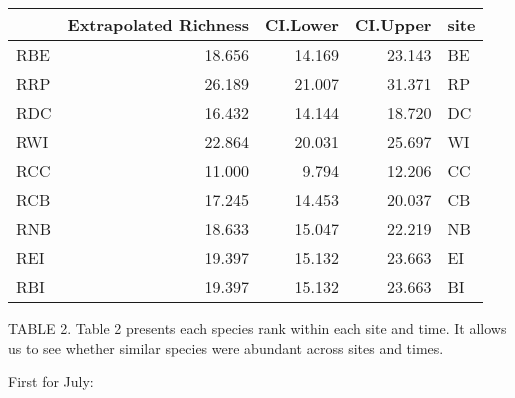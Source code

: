 \documentclass[]{article}
\begin{document}
\begin{longtable}[]{@{}lrrrl@{}}
\toprule
& Extrapolated Richness & CI.Lower & CI.Upper & site\tabularnewline
\midrule
\endhead
RBE & 18.656 & 14.169 & 23.143 & BE\tabularnewline
RRP & 26.189 & 21.007 & 31.371 & RP\tabularnewline
RDC & 16.432 & 14.144 & 18.720 & DC\tabularnewline
RWI & 22.864 & 20.031 & 25.697 & WI\tabularnewline
RCC & 11.000 & 9.794 & 12.206 & CC\tabularnewline
RCB & 17.245 & 14.453 & 20.037 & CB\tabularnewline
RNB & 18.633 & 15.047 & 22.219 & NB\tabularnewline
REI & 19.397 & 15.132 & 23.663 & EI\tabularnewline
RBI & 19.397 & 15.132 & 23.663 & BI\tabularnewline
\bottomrule
\end{longtable}

TABLE 2. Table 2 presents each species rank within each site and time.
It allows us to see whether similar species were abundant across sites
and times.

First for July:
\end{document}
